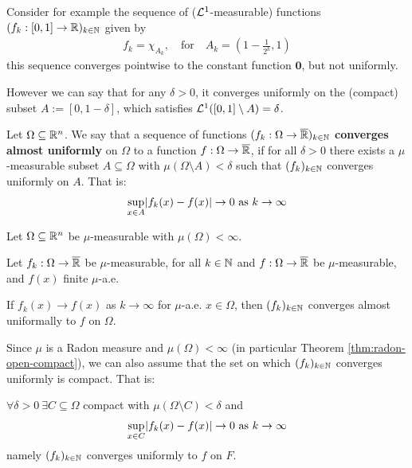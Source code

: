 Consider for example the sequence of ($\mathcal{L}^{1}$-measurable) functions $(f_k: [0,1] \to \mathbb{R})_{k \in \mathbb{N}}$ given by
\begin{align*}
  f_k = \chi_{A_k}, \quad \text{for} \quad A_{k} = \left(1 - \frac{1}{2^{k}},1\right)
\end{align*}
this sequence converges pointwise to the constant function $\bm{0}$, but not uniformly.

However we can say that for any $\delta > 0$, it converges uniformly on the (compact) subset $A := [0,1 - \delta]$, which satisfies $\mathcal{L}^{1}([0,1] \setminus A) = \delta$.


\begin{dfn}[]
  Let $\Omega \subseteq \mathbb{R}^{n}$.
  We say that a sequence of functions $(f_k: \Omega \to \overline{\mathbb{R}})_{k \in \mathbb{N}}$ \textbf{converges almost uniformly} on $\Omega$ to a function $f: \Omega \to \overline{\mathbb{R}}$,
if for all $\delta > 0$ there exists a $\mu$-measurable subset $A \subseteq \Omega$ with $\mu(\Omega \setminus A) < \delta$ such that $(f_k)_{k \in \mathbb{N}}$ converges uniformly on $A$.
That is:
\begin{align*}
  \sup_{x \in A} \abs{f_k(x) - f(x)} \to  0 \text{ as } k \to  \infty
\end{align*}
\end{dfn}


\begin{thm}[Egoroff]
  Let $\Omega \subseteq \mathbb{R}^{n}$ be $\mu$-measurable with $\mu(\Omega) < \infty$.

  Let $f_k: \Omega \to \overline{\mathbb{R}}$ be $\mu$-measurable, for all $k \in \mathbb{N}$ and $f: \Omega \to \overline{\mathbb{R}}$ be $\mu$-measurable, and $f(x)$ finite $\mu$-a.e.

  If $f_k(x) \to  f(x)$ as $k \to  \infty$ for $\mu$-a.e. $x \in \Omega$, then
  $(f_k)_{k \in \mathbb{N}}$ converges almost uniformally to $f$ on $\Omega$.

  Since $\mu$ is a Radon measure and $\mu(\Omega) < \infty$ (in particular Theorem \ref{thm:radon-open-compact}),
  we can also assume that the set on which $(f_k)_{k \in \mathbb{N}}$ converges uniformly is compact.
  That is:

$\forall \delta > 0\ \exists C \subseteq \Omega$ compact with $\mu(\Omega \setminus C) < \delta$ and
\begin{align*}
  \sup_{x \in C} \abs{f_k(x) - f(x)} \to 0 \text{ as } k \to  \infty
\end{align*}
namely $(f_k)_{k \in \mathbb{N}}$ converges uniformly to $f$ on $F$.
\end{thm}

